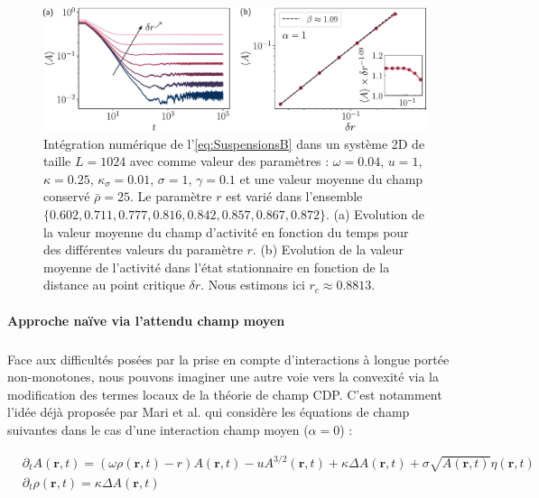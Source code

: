 \begin{figure}[h]
	\centering
	\includegraphics[width=\textwidth]{Chapitre5/Figures/SuspensionsB.pdf}
	\caption{Intégration numérique de l'\autoref{eq:SuspensionsB} dans un système 2D de taille $L=1024$ avec comme valeur des paramètres : $\omega = 0.04$, $u = 1$, $\kappa = 0.25$, $\kappa_\sigma = 0.01$, $\sigma = 1$, $\gamma = 0.1$ et une valeur moyenne du champ conservé $\bar{\rho} = 25$. Le paramètre $r$ est varié dans l'ensemble $\{ 0.602, 0.711, 0.777, 0.816, 0.842, 0.857, 0.867, 0.872\}$. (a) Evolution de la valeur moyenne du champ d'activité en fonction du temps pour des différentes valeurs du paramètre $r$. (b) Evolution de la valeur moyenne de l'activité dans l'état stationnaire en fonction de la distance au point critique $\delta r$. Nous estimons ici $r_c \approx 0.8813$.}
	\label{fig:SuspensionsB}
\end{figure}

\paragraph{Approche naïve via l'attendu champ moyen}

\label{sec:CMnaif}

\subparagraph{}Face aux difficultés posées par la prise en compte d'interactions à longue portée non-monotones, nous pouvons imaginer une autre voie vers la convexité via la modification des termes locaux de la théorie de champ CDP. C'est notamment l'idée déjà proposée par Mari et al. \cite{mari_absorbing_2022} qui considère les équations de champ suivantes dans le cas d'une interaction champ moyen ($\alpha = 0$) :

\begin{equation}
\begin{aligned}
	&\partial_t A(\mathbf{r}, t) = (\omega\rho (\mathbf{r}, t) - r)A(\mathbf{r}, t) - uA^{3/2}(\mathbf{r}, t) + \kappa\Delta A (\mathbf{r}, t) + \sigma \sqrt{A(\mathbf{r}, t)} \eta(\mathbf{r}, t)\\
	&\partial_t \rho (\mathbf{r}, t) = \kappa\Delta A (\mathbf{r}, t)
\end{aligned}
\label{eq:CDP32}
\end{equation}

